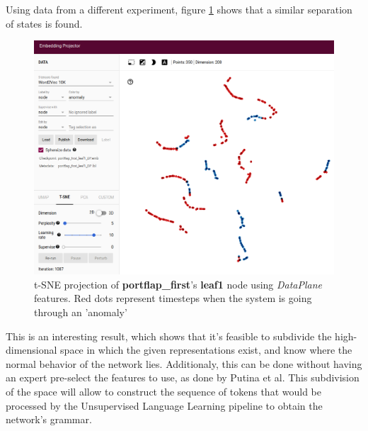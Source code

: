 Using data from a different experiment, figure \ref{fig:portflap_first_leaf1_DP} shows that a similar separation of states is found.
\begin{figure}[h!]
	\centering
	\includegraphics[width=0.8\linewidth]{Figure/portflap_first_leaf1_DP.png}
	\caption{t-SNE projection of \textbf{portflap\_first}'s \textbf{leaf1} node using \textit{DataPlane} features. Red dots represent timesteps when the system is going through an 'anomaly'}
	\label{fig:portflap_first_leaf1_DP}
\end{figure}

This is an interesting result, which shows that it's feasible to subdivide the high-dimensional space in which the given representations exist, and know where the normal behavior of the network lies.
Additionaly, this can be done without having an expert pre-select the features to use, as done by Putina et al\cite{putina_telemetry-based_2018}.
This subdivision of the space will allow to construct the sequence of tokens that would be processed by the Unsupervised Language Learning pipeline to obtain the network's grammar.


